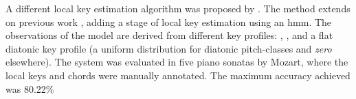 




A different local key estimation algorithm was proposed by
\textcite{papadopoulos2009local}. The method extends on
previous work \parencite{papadopoulos2008simultaneous},
adding a stage of local key estimation using an \gls{hmm}.
The observations of the model are derived from different key
profiles: \textcite{krumhansl1982tracing},
\textcite{temperley1999whats}, and a flat diatonic key
profile (a uniform distribution for diatonic pitch-classes
and \emph{zero} elsewhere). The system was evaluated in five
piano sonatas by Mozart, where the local keys and chords
were manually annotated. The maximum accuracy achieved was
80.22\%

